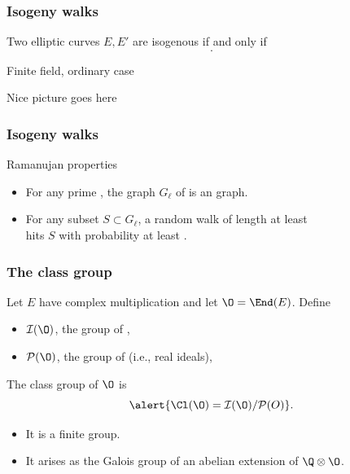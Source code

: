 \documentclass{beamer}
\renewcommand{\emph}[1]{}
\begin{document}

\begin{frame}
  \frametitle{Isogeny walks}

  \begin{theorem}
    Two elliptic curves $E,E'$ are isogenous if and only if
    \[\emph{\Q\otimes\End(E) \simeq \Q\otimes\End(E')}.\]
  \end{theorem}

  \emph{Example:} Finite field, ordinary case

  \begin{center}
    Nice picture goes here
  \end{center}
\end{frame}


\begin{frame}
  \frametitle{Isogeny walks}

  \begin{block}{Ramanujan properties}
    \begin{itemize}
    \item For any prime \emph{$\ell$}, the graph $G_\ell$ of
      \emph{$\ell$-isogenies} is an \emph{$\ell+1$-regular} graph.
    \item For any subset $S\subset G_\ell$, a random walk of length at
      least \[\emph{\sim\frac{2|G_\ell|}{\sqrt{|S|}}}\] hits $S$ with
      probability at least \emph{$|S|/2|G|$}.
    \end{itemize}
  \end{block}
\end{frame}


\begin{frame}
  \frametitle{The class group}
  
  Let $E$ have complex multiplication and let $\O = \End(E)$. Define

  \begin{itemize}
  \item $\mathcal{I}(\O)$, the group of \emph{invertible fractional ideals},
  \item $\mathcal{P}(\O)$, the group of \emph{principal ideals} (i.e., real
    ideals),
  \end{itemize}
  
  \begin{definition}
    The \alert{class group} of $\O$ is \[\alert{\Cl(\O) =
      \mathcal{I}(\O)/\mathcal{P}(O)}.\]
  \end{definition}

  \begin{itemize}
  \item It is a finite group.
  \item It arises as the Galois group of an abelian extension of
    $\Q\otimes\O$.
  \end{itemize}
\end{frame}
\end{document}
